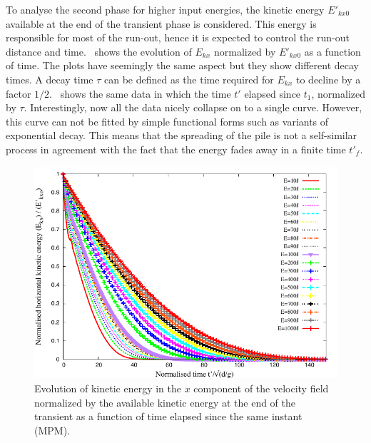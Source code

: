 To analyse the second phase for higher input energies, the 
kinetic energy $E'_{kx0}$ available at the end of the transient phase is 
considered. This energy is responsible for most of the run-out, hence it is 
expected to 
control the run-out distance and time.~ 
shows the evolution of $E_{kx}$ normalized by $E'_{kx0}$ as a function of time. 
The plots have seemingly the same aspect but they show different decay times. A 
decay time $\tau$ can be defined as the time required for $E_{kx}$ to decline 
by a factor $1/2$.~ shows the same data in 
which the time $t'$ elapsed since $t_1$, normalized by $\tau$. Interestingly, 
now all the data nicely collapse on to a single curve. However, this curve can 
not be fitted by simple functional forms such as variants of exponential decay. 
This means that the spreading of the pile is not a self-similar process in 
agreement with the fact that the energy fades away in a finite time $t'_f$. 

\begin{figure}[tbhp]
\centering
\includegraphics[width=\textwidth]{Normalised_KExExop_Slope}
\caption{Evolution of kinetic energy in the $x$ component of the
velocity field normalized by the available kinetic energy at the
end of the transient as a function of time elapsed since the
same instant (MPM).}
\label{fig:Normalised_KExExop_Slope}
\end{figure}

